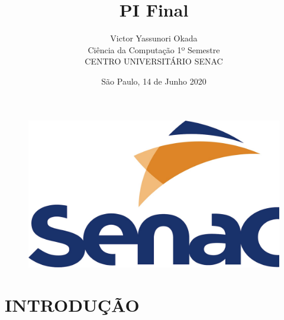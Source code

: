 \documentclass[a4paper, 12pt]{article}
\begin{document}
\title{PI Final}
\author{Victor Yassunori Okada\\Ciência da Computação 1º Semestre\\CENTRO UNIVERSITÁRIO SENAC}
\date{São Paulo, 14 de Junho 2020}
 \begin{figure}
        \centering
        \includegraphics[scale=0.1]{Senac-logo.jpg}
        \label{fig:my_label}
    \end{figure}


\maketitle
 \newpage
 \tableofcontents \newpage



 \newpage
\section{INTRODUÇÃO}
\end{document}
